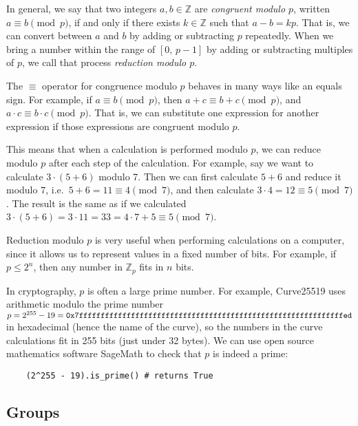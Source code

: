 \documentclass[manuscript]{acmart}
\begin{document}
In general, we say that two integers $a, b \in \mathbb{Z}$ are \emph{congruent modulo $p$}, written $a \equiv b \pmod{p}$, if and only if there exists $k \in \mathbb{Z}$ such that $a - b = kp$.
That is, we can convert between $a$ and $b$ by adding or subtracting $p$ repeatedly.
When we bring a number within the range of $[0,\, p-1]$ by adding or subtracting multiples of $p$, we call that process \emph{reduction modulo $p$}.

The $\equiv$ operator for congruence modulo $p$ behaves in many ways like an equals sign.
For example, if $a \equiv b \pmod{p}$, then $a+c \equiv b+c \pmod{p}$, and $a \cdot c \equiv b \cdot c \pmod{p}$.
That is, we can substitute one expression for another expression if those expressions are congruent modulo $p$.

This means that when a calculation is performed modulo $p$, we can reduce modulo $p$ after each step of the calculation.
For example, say we want to calculate $3 \cdot (5 + 6)$ modulo 7.
Then we can first calculate $5+6$ and reduce it modulo $7$, i.e.\ $5+6 = 11 \equiv 4 \pmod{7}$, and then calculate $3 \cdot 4 = 12 \equiv 5 \pmod{7}
$.
The result is the same as if we calculated $3 \cdot (5 + 6) = 3 \cdot 11 = 33 = 4 \cdot 7 + 5 \equiv 5 \pmod{7}$.

Reduction modulo $p$ is very useful when performing calculations on a computer, since it allows us to represent values in a fixed number of bits.
For example, if $p \le 2^n$, then any number in $\mathbb{Z}_p$ fits in $n$ bits.

In cryptography, $p$ is often a large prime number.
For example, Curve25519 uses arithmetic modulo the prime number $p=2^{255}-19=\verb|0x7fffffffffffffffffffffffffffffffffffffffffffffffffffffffffffffed|$ in hexadecimal (hence the name of the curve), so the numbers in the curve calculations fit in 255 bits (just under 32 bytes).
We can use open source mathematics software SageMath to check that $p$ is indeed a prime:
\begin{verbatim}
    (2^255 - 19).is_prime() # returns True
\end{verbatim}

\subsection{Groups}\label{sec:groups}
\end{document}
